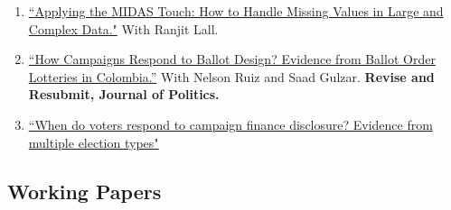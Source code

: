 \documentclass[11pt, a4paper]{article}
\begin{document}
\begin{enumerate}

\item \href{https://doi.org/10.33774/apsa-2020-3tk40-v3}{``Applying the MIDAS Touch: How to Handle Missing Values in Large and Complex Data."} With Ranjit Lall.

\item \href{https://www.dropbox.com/s/4uybbp4h9shmzxt/ballots_colombia.pdf?raw=1}{``How Campaigns Respond to Ballot Design? Evidence from Ballot Order Lotteries in Colombia.''} With Nelson Ruiz and Saad Gulzar. \textbf{Revise and Resubmit, Journal of Politics.}

\item \href{https://ts-robinson.com/publication/robinson-voters-disclosure-2020/robinson-voters-disclosure-2020.pdf}{``When do voters respond to campaign finance disclosure? Evidence from multiple election types"}


\end{enumerate}

\subsection*{Working Papers}
\end{document}
